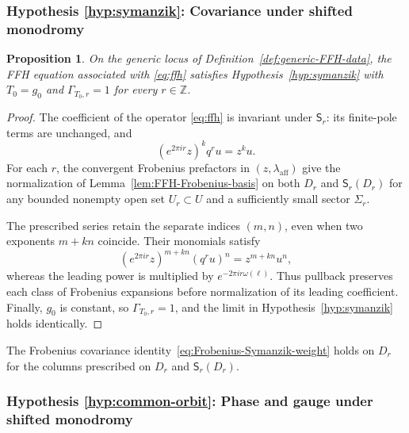 \documentclass[11pt,leqno]{amsart}
\numberwithin{equation}{section}
\theoremstyle{plain}
\newtheorem{proposition}[theorem]{Proposition}
\theoremstyle{definition}
\theoremstyle{plain}
\theoremstyle{definition}
\theoremstyle{remark}
\begin{document}
\subsubsection{Hypothesis \ref{hyp:symanzik}: Covariance under shifted monodromy}\label{sec:FFH-hyp-covariance}

\begin{proposition}\label{prop:FFH-integral-covariance}
On the generic locus of Definition~\ref{def:generic-FFH-data}, the FFH equation associated with \eqref{eq:ffh} satisfies Hypothesis~\ref{hyp:symanzik} with $T_0=g_0$ and $\Gamma_{T_0,r}=1$ for every $r\in\mathbb Z$.
\end{proposition}
\begin{proof}
The coefficient of the operator \eqref{eq:ffh} is invariant under $\mathsf S_r$: its finite-pole terms are unchanged, and
\[
 (e^{2\pi ir}z)^kq^ru=z^ku.
\]
For each $r$, the convergent Frobenius prefactors in $(z,\lambda_{\mathrm{aff}})$ give the normalization of Lemma~\ref{lem:FFH-Frobenius-basis} on both $D_r$ and $\mathsf S_r(D_r)$ for any bounded nonempty open set $U_r\subset U$ and a sufficiently small sector $\Sigma_r$.

The prescribed series retain the separate indices $(m,n)$, even when two exponents $m+kn$ coincide.  Their monomials satisfy
\[
 (e^{2\pi ir}z)^{m+kn}(q^ru)^n=z^{m+kn}u^n,
\]
whereas the leading power is multiplied by $e^{-2\pi ir\omega(\ell)}$.  Thus pullback preserves each class of Frobenius expansions before normalization of its leading coefficient.  Finally, $g_0$ is constant, so $\Gamma_{T_0,r}=1$, and the limit in Hypothesis~\ref{hyp:symanzik} holds identically.
\end{proof}

The Frobenius covariance identity~\eqref{eq:Frobenius-Symanzik-weight} holds on $D_r$ for the columns prescribed on $D_r$ and $\mathsf S_r(D_r)$.

\subsubsection{Hypothesis \ref{hyp:common-orbit}: Phase and gauge under shifted monodromy}\label{sec:FFH-hyp-matching}\label{sec:FFH-log-normalization}
\end{document}

